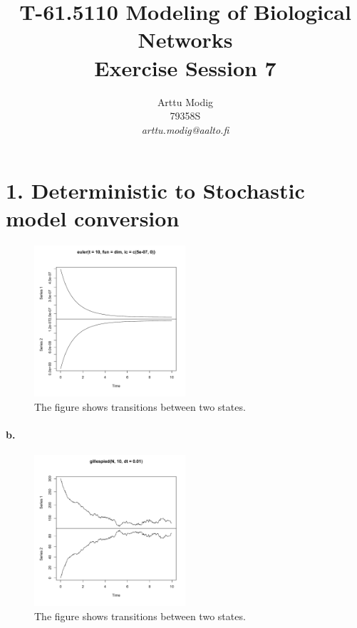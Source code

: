 \documentclass[a4paper,english]{article}
\title{T-61.5110 Modeling of Biological Networks \\ Exercise Session 7}
\author{Arttu Modig \\ 79358S \\
       {\it arttu.modig@aalto.fi}}
\begin{document}
\maketitle


\onehalfspacing
\section*{1. Deterministic to Stochastic model conversion}

\begin{figure}
    \begin{center}
        \includegraphics[width=0.5\textwidth]{dimer}
        \caption{The figure shows transitions between two states.}
        \label{rplot}
    \end{center}
\end{figure}

\paragraph{b.}

\begin{figure}
    \begin{center}
        \includegraphics[width=0.5\textwidth]{dimer-stoch}
        \caption{The figure shows transitions between two states.}
        \label{rplot}
    \end{center}
\end{figure}
\end{document}
